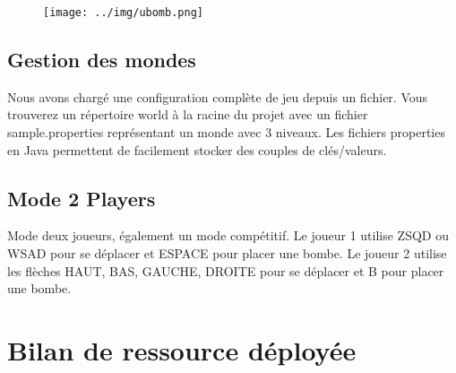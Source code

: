 \documentclass[11pt,english]{article}
\begin{document}
\begin{figure}[H]
    \begin{center}
        \texttt{[image: ../img/ubomb.png]}
    \end{center}
\end{figure}

\subsection{ Gestion des mondes }

\indent

Nous avons chargé une configuration complète de jeu depuis un fichier. Vous trouverez un répertoire world à la racine du projet avec un fichier sample.properties représentant un monde avec 3 niveaux. Les fichiers properties en Java permettent de facilement stocker des couples de clés/valeurs.

\subsection{Mode 2 Players}

\indent

Mode deux joueurs, également un mode compétitif. Le joueur 1 utilise ZSQD ou WSAD pour se déplacer et ESPACE pour placer une bombe. Le joueur 2 utilise les flèches HAUT, BAS, GAUCHE, DROITE pour se déplacer et B pour placer une bombe.

\section {Bilan de ressource déployée}

\indent
\end{document}
